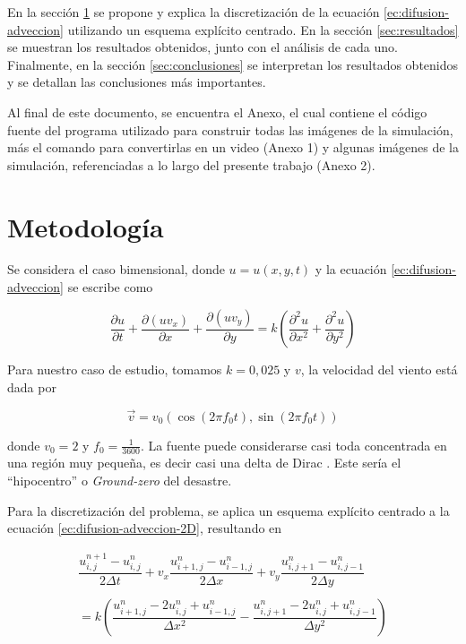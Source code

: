 \documentclass[twocolumn,a4paper,10pt]{article}
\begin{document}
En la secci\'on \ref{sec:metodologia} se propone y explica la discretizaci\'on de la ecuaci\'on \ref{ec:difusion-adveccion} utilizando un esquema expl\'icito centrado. En la secci\'on \ref{sec:resultados} se muestran los resultados obtenidos, junto con el an\'alisis de cada uno. Finalmente, en la secci\'on \ref{sec:conclusiones} se interpretan los resultados obtenidos y se detallan las conclusiones m\'as importantes.

Al final de este documento, se encuentra el Anexo, el cual contiene el c\'odigo fuente del programa utilizado para construir todas las im\'agenes de la simulaci\'on, 
m\'as el comando para convertirlas en un video (Anexo 1) y  algunas im\'agenes de la simulaci\'on, referenciadas a lo largo del presente trabajo (Anexo 2).

\section{Metodolog\'ia}
\label{sec:metodologia}
Se considera el caso bimensional, donde $u = u(x,y,t)$ y la ecuaci\'on \ref{ec:difusion-adveccion} se escribe como \cite{Guia2-MNA}

\begin{equation}
\label{ec:difusion-adveccion-2D}
\frac{\partial u}{\partial t} + \frac{\partial (uv_{x})}{\partial x} + \frac{\partial (uv_{y})}{\partial y}  = k \left(\frac{\partial^2 u}{\partial x^2} + \frac{\partial^2 u}{\partial y^2}\right)
\end{equation}

Para nuestro caso de estudio, tomamos $k = 0,025$ y $v$, la velocidad del viento est\'a dada por 

\begin{equation}
    \vec{v} = v_{0}(\cos (2\pi f_{0}t), \sin (2\pi f_{0}t))
\end{equation}

donde $v_{0} = 2$ y $f_{0} = \frac{1}{3600}$. La fuente puede considerarse casi toda concentrada en una regi\'on muy pequeña, es decir casi una 
delta de Dirac \cite{Guia2-MNA}. Este sería el ``hipocentro'' o \textit{Ground-zero} \cite{Ground-zero} del desastre.

Para la discretizaci\'on del problema, se aplica un esquema expl\'icito centrado a la ecuaci\'on \ref{ec:difusion-adveccion-2D}, resultando en 

\begin{equation}
\label{ec:discretizacion}
\begin{array}{c}
    \dfrac{u_{i,j}^{n+1} - u_{i,j}^{n}}{2\Delta t} + v_{x}\dfrac{u_{i+1,j}^{n} - u_{i-1,j}^{n}}{2\Delta x} + v_{y}\dfrac{u_{i,j+1}^{n} - u_{i,j-1}^{n}}{2\Delta y} \\
    \\
    = k \left( \dfrac{u_{i+1,j}^{n} - 2u_{i,j}^{n} + u_{i-1,j}^{n}}{\Delta x^2} - \dfrac{u_{i,j+1}^{n} - 2u_{i,j}^{n} + u_{i,j-1}^{n}}{\Delta y^2}  \right)
\end{array}       
\end{equation}
\end{document}

